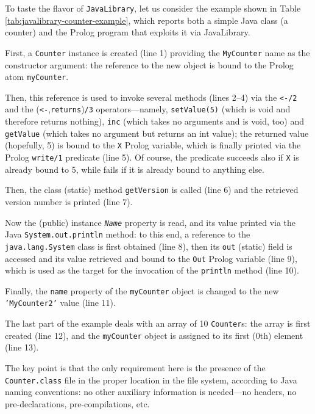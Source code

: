 To taste the flavor of \texttt{JavaLibrary}, let us consider the example shown in Table \ref{tab:javalibrary-counter-example}, which reports both a simple Java class (a counter) and the Prolog program that exploits it via JavaLibrary.

First, a \texttt{Counter} instance is created (line 1) providing the \texttt{MyCounter} name as the constructor argument: the reference to the new object is bound to the Prolog atom \texttt{myCounter}.

Then, this reference is used to invoke several methods (lines 2--4) via the \verb|<-/2| and the (\verb|<-|,\texttt{returns})\texttt{/3} operators---namely, \texttt{setValue(5)} (which is void and therefore returns nothing), \texttt{inc} (which takes no arguments and is void, too) and \texttt{getValue} (which takes no argument but returns an int value);
the returned value (hopefully, 5) is bound to the \texttt{X} Prolog variable, which is finally printed via the Prolog \texttt{write/1} predicate (line 5).
%
Of course, the predicate succeeds also if \texttt{X} is already bound to 5, while fails if it is already bound to anything else.

Then, the class (static) method \texttt{getVersion} is called (line 6) and the retrieved version number is printed (line 7).

Now the (public) instance \textit{\texttt{Name}} property is read, and its value printed via the Java \texttt{System.out.println} method: to this end, a reference to the \texttt{java.lang.System} class is first obtained (line 8), then its \texttt{out} (static) field is accessed and its value retrieved and bound to the \texttt{Out} Prolog variable (line 9), which is used as the target for the invocation of the \texttt{println} method (line 10).

Finally, the \texttt{name} property of the \texttt{myCounter} object is changed to the new \texttt{'MyCounter2'} value (line 11).

The last part of the example deals with an array of 10 \texttt{Counter}s: the array is first created (line 12), and the \texttt{myCounter} object is assigned to its first (0th) element (line 13).

The key point is that the only requirement here is the presence of the \texttt{Counter.class} file in the proper location in the file system, according to Java naming conventions: no other auxiliary information is needed---no headers, no pre-declarations, pre-compilations, etc.


